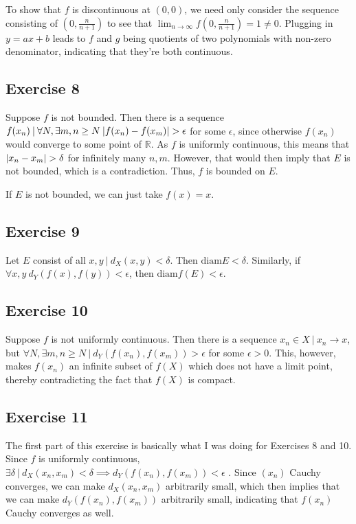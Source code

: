 To show that $f$ is discontinuous at $(0, 0)$, we need only consider the sequence consisting of 
$(0, \frac{n}{n + 1})$ to see that $\lim_{n \to \infty} f(0, \frac{n}{n+1}) = 1 \neq 0$. Plugging in
$y = ax + b$ leads to $f$ and $g$ being quotients of two polynomials with non-zero denominator,
indicating that they're both continuous.

\subsection{Exercise 8}
Suppose $f$ is not bounded. Then there is a sequence $f(x_n) \: | \: \forall N, \exists m, n \geq N \: \abs{f(x_n) - f(x_m)} > \epsilon$ for some
$\epsilon$, since otherwise $f(x_n)$ would converge to some point of $\mathbb{R}$. As $f$ is 
uniformly continuous, this means that $\abs{x_n - x_m} > \delta$ for infinitely many $n, m$.
However, that would then imply that $E$ is not bounded, which is a contradiction. Thus, $f$ is bounded on
$E$.

If $E$ is not bounded, we can just take $f(x) = x$.

\subsection{Exercise 9}
Let $E$ consist of all $x, y \: | \: d_X (x, y) < \delta$. Then $\text{diam} E < \delta$. Similarly, if
$\forall x, y \: d_Y(f(x), f(y)) < \epsilon$, then $\text{diam} f(E) < \epsilon$.

\subsection{Exercise 10}
Suppose $f$ is not uniformly continuous. Then there is a sequence $x_n \in X \: | \: x_n \to x$, but
$\forall N, \exists m, n \geq N \: | \: d_Y(f(x_n), f(x_m)) > \epsilon$ for some $\epsilon > 0$. This,
however, makes $f(x_n)$ an infinite subset of $f(X)$ which does not have a limit point, thereby 
contradicting the fact that $f(X)$ is compact.

\subsection{Exercise 11}
The first part of this exercise is basically what I was doing for Exercises 8 and 10. Since $f$ 
is uniformly continuous, $\exists \delta \: | \: d_X(x_n, x_m) < \delta \implies d_Y(f(x_n), f(x_m)) < \epsilon$
. Since $(x_n)$ Cauchy converges, we can make $d_X(x_n, x_m)$ arbitrarily small, which then implies that
we can make $d_Y(f(x_n), f(x_m))$ arbitrarily small, indicating that $f(x_n)$ Cauchy converges as well.

